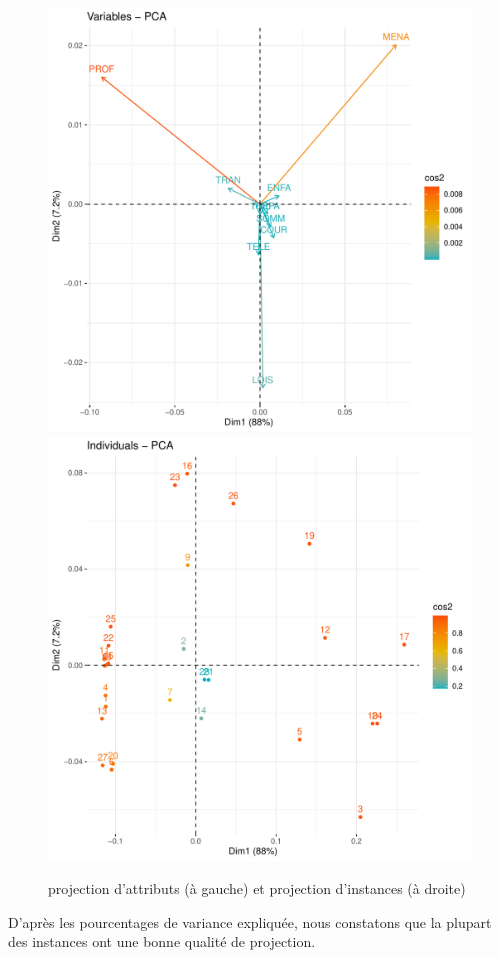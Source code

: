 \documentclass[11pt]{article}
\begin{document}
\begin{figure}[H]
  \centering
  \includegraphics[scale=0.4]{../plot/pca-attribute-projection.pdf}
  \includegraphics[scale=0.4]{../plot/pca-instance-projection.pdf}
  \caption{projection d'attributs (à gauche) et projection d'instances (à droite)}
  \label{fig:pca-projection}
\end{figure}
D'après les pourcentages de variance expliquée, nous constatons que la plupart
des instances ont une bonne qualité de projection.
\end{document}
